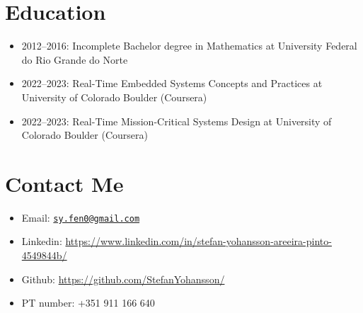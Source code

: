 \documentclass[
]{article}
\providecommand{\tightlist}{%
  \setlength{\itemsep}{0pt}\setlength{\parskip}{0pt}}
\begin{document}
\hypertarget{education}{%
\section{Education}\label{education}}

\begin{itemize}
\tightlist
\item
  2012--2016: Incomplete Bachelor degree in Mathematics at University
  Federal do Rio Grande do Norte
\item
  2022--2023: Real-Time Embedded Systems Concepts and Practices at
  University of Colorado Boulder (Coursera)
\item
  2022--2023: Real-Time Mission-Critical Systems Design at University of
  Colorado Boulder (Coursera)
\end{itemize}

\hypertarget{contact-me}{%
\section{Contact Me}\label{contact-me}}

\begin{itemize}
\tightlist
\item
  Email: \href{mailto:sy.fen0@gmail.com}{\nolinkurl{sy.fen0@gmail.com}}
\item
  Linkedin:
  \url{https://www.linkedin.com/in/stefan-yohansson-areeira-pinto-4549844b/}
\item
  Github: \url{https://github.com/StefanYohansson/}
\item
  PT number: +351 911 166 640
\end{itemize}
\end{document}
